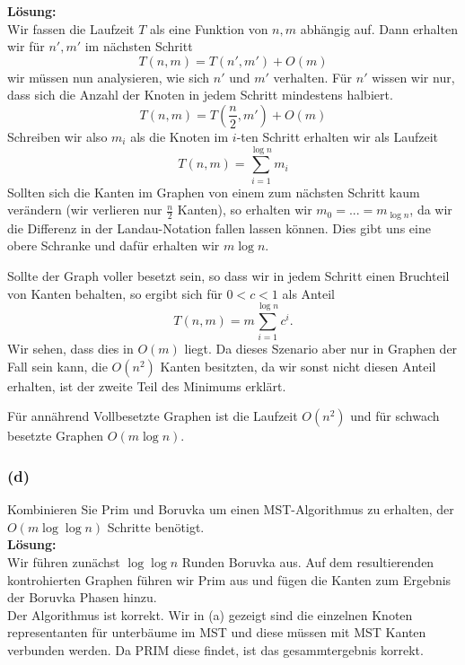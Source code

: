 \documentclass[11pt,a4paper,ngerman]{article}
\begin{document}
\textbf{Lösung:}\\

Wir fassen die Laufzeit $T$ als eine Funktion von $n,m$ abhängig auf.
Dann erhalten wir für $n',m'$ im nächsten Schritt
$$
    T(n,m) = T(n',m') + O(m)
$$
wir müssen nun analysieren, wie sich $n'$ und $m'$ verhalten. Für $n'$ wissen
wir nur, dass sich die Anzahl der Knoten in jedem Schritt mindestens halbiert.
$$
    T(n,m) = T(\frac{n}{2}, m') + O(m)
$$
Schreiben wir also $m_i$ als die Knoten im $i$-ten Schritt erhalten wir als Laufzeit
$$
    T(n,m) = \overset{\log n}{\underset{i = 1}{\sum}} m_i
$$
Sollten sich die Kanten im Graphen von einem zum nächsten Schritt kaum verändern (wir verlieren nur $\frac{n}{2}$ Kanten),
so erhalten wir $m_0 = ... = m_{\log n}$, da wir die Differenz in der Landau-Notation fallen lassen können. Dies gibt uns eine obere Schranke und
dafür erhalten wir $m \log n$. 

Sollte der Graph voller besetzt sein, so dass wir in jedem Schritt einen Bruchteil von Kanten behalten,
so ergibt sich für $0 < c < 1$ als Anteil
$$
    T(n,m) = m \overset{\log n}{\underset{i = 1}{\sum}} c^i.
$$
Wir sehen, dass dies in $O(m)$ liegt. Da dieses Szenario aber nur in Graphen der Fall sein kann, die $O(n^2)$ Kanten besitzten,
da wir sonst nicht diesen Anteil erhalten, ist der zweite Teil des Minimums erklärt.

Für annährend Vollbesetzte Graphen ist die Laufzeit $O(n^2)$ und für schwach besetzte Graphen $O(m \log n)$.

\subsubsection*{(d)}

Kombinieren Sie Prim und Boruvka um einen MST-Algorithmus zu erhalten, der $O(m \log \log n)$ Schritte benötigt.\\

\textbf{Lösung:}\\

Wir führen zunächst $\log \log n$ Runden Boruvka aus. Auf dem resultierenden kontrohierten Graphen führen wir
Prim aus und fügen die Kanten zum Ergebnis der Boruvka Phasen hinzu.\\

Der Algorithmus ist korrekt. Wir in (a) gezeigt sind die einzelnen Knoten representanten für unterbäume im MST und diese
müssen mit MST Kanten verbunden werden. Da PRIM diese findet, ist das gesammtergebnis korrekt.\\
\end{document}
